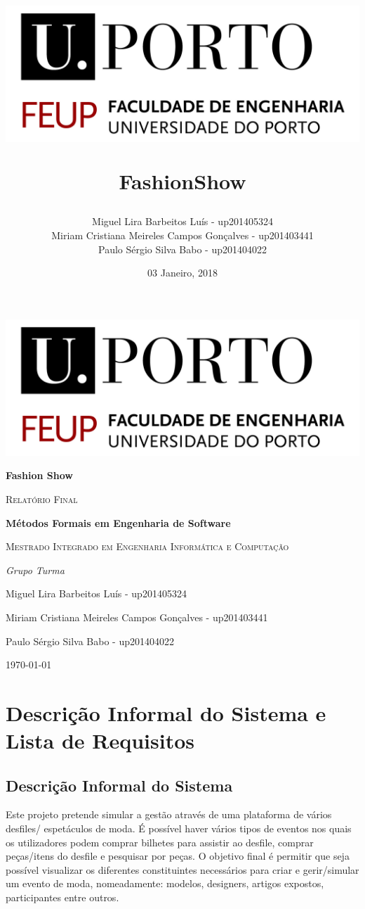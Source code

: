 \documentclass{article}
\title{ \begin{center}
					\includegraphics[scale=0.6]{./images/FEUPlogo}
				\end{center}
				\textbf{FashionShow}}
\author{Miguel Lira Barbeitos Luís - up201405324\\
		Miriam Cristiana Meireles Campos Gonçalves - up201403441\\
		Paulo Sérgio Silva Babo - up201404022}
\date{03 Janeiro, 2018}
\begin{document}
\begin{titlepage}
	\centering
	\includegraphics[width=1\textwidth]{./images/FEUPlogo}\par\vspace{1cm}
	{\huge\bfseries Fashion Show \par}
	\vspace{2cm}
	{\scshape\Large Relatório Final\par}
	\vspace{1.5cm}
	{\large\bfseries Métodos Formais em Engenharia de Software\par}
	\vspace{0.7cm}
	{\scshape\normalsize  Mestrado Integrado em Engenharia Informática e Computação \par}
	\vspace{1.5cm}
	{\Large\itshape Grupo Turma 
	\par Miguel Lira Barbeitos Luís - up201405324 \par
	Miriam Cristiana Meireles Campos Gonçalves - up201403441 \par
	Paulo Sérgio Silva Babo - up201404022\par}

	\vfill
	{\large \today\par}
\end{titlepage}
\thispagestyle{empty}

\newpage

\tableofcontents

\newpage

\section{Descrição Informal do Sistema e Lista de Requisitos}
\subsection{Descrição Informal do Sistema}
Este projeto pretende simular a gestão através de uma plataforma de vários desfiles/ espetáculos de moda. É possível haver vários tipos de eventos nos quais os utilizadores podem comprar bilhetes para assistir ao desfile,  comprar peças/itens do desfile e pesquisar por peças.
\newline
O objetivo final é permitir que seja possível visualizar os diferentes constituintes necessários para criar e gerir/simular um evento de moda, nomeadamente: modelos, designers, artigos expostos, participantes entre outros.  
\end{document}
